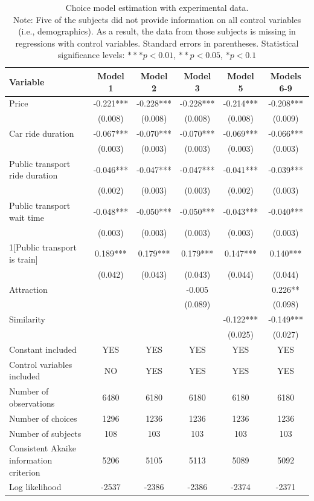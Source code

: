 \documentclass[a4paper,12pt]{article}
\begin{document}
\clearpage
\begin{table}
    \centering
    \begin{tabular}{p{7cm}ccccc}
    \toprule
    Variable & Model 1 & Model 2 & Model 3 & Model 5 & Models 6-9 \\
    \midrule
    Price & -0.221*** & -0.228*** & -0.228*** & -0.214*** & -0.208*** \\
    & (0.008) & (0.008) & (0.008) & (0.008) & (0.009) \\
    Car ride duration & -0.067*** & -0.070*** & -0.070*** & -0.069*** & -0.066*** \\
    & (0.003) & (0.003) & (0.003) & (0.003) & (0.003) \\
    Public transport ride duration & -0.046*** & -0.047*** & -0.047*** & -0.041*** & -0.039*** \\
    & (0.002) & (0.003) & (0.003) & (0.002) & (0.003) \\
    Public transport wait time & -0.048*** & -0.050*** & -0.050*** & -0.043*** & -0.040*** \\
    & (0.003) & (0.003) & (0.003) & (0.003) & (0.003) \\
    1[Public transport is train] & 0.189*** & 0.179*** & 0.179*** & 0.147*** & 0.140*** \\
    & (0.042) & (0.043) & (0.043) & (0.044) & (0.044) \\
    Attraction & & & -0.005 & & 0.226** \\
    & & & (0.089) & & (0.098) \\
    Similarity & & & & -0.122*** & -0.149*** \\
    & & & & (0.025) & (0.027) \\
    Constant included & YES & YES & YES & YES & YES \\
    Control variables included & NO & YES & YES & YES & YES \\
    Number of observations & 6480 & 6180 & 6180 & 6180 & 6180 \\
    Number of choices & 1296 & 1236 & 1236 & 1236 & 1236 \\
    Number of subjects & 108 & 103 & 103 & 103 & 103 \\
    Consistent Akaike information criterion & 5206 & 5105 & 5113 & 5089 & 5092 \\
    Log likelihood & -2537 & -2386 & -2386 & -2374 & -2371 \\
    \bottomrule
    \end{tabular}
    \caption{Choice model estimation with experimental data. \\
    Note: Five of the subjects did not provide information on all control variables (i.e., demographics). As a result, the data from those subjects is missing in regressions with control variables. Standard errors in parentheses. Statistical significance levels: $*** p<0.01$, $** p<0.05$, $* p<0.1$}
    \label{tab:nejcModelResults}
\end{table}
\end{document}
